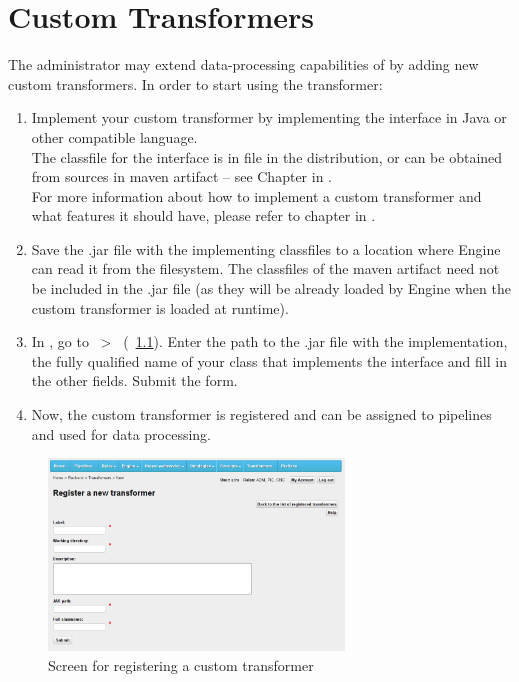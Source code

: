 \chapter{Custom Transformers}
\label{chap:customTransformers}
The administrator may extend data-processing capabilities of \odcs by adding new custom transformers. In order to start using the transformer:
\begin{enumerate}
  \item Implement your custom transformer by implementing the  interface in Java or other compatible language.\\
  The classfile for the  interface is in  file in the \odcs distribution, or can be obtained from sources in  maven artifact -- see Chapter  in . \\
  For more information about how to implement a custom transformer and what features it should have, please refer to chapter  in .
  \item Save the .jar file with the implementing classfiles to a location where Engine can read it from the filesystem. The classfiles of the  maven artifact need not be included in the .jar file (as they will be already loaded by Engine when the custom transformer is loaded at runtime).
  \item In \FE, go to ~\textgreater~ (\figurename~\ref{fig:customTransformer}). Enter the path to the .jar file with the implementation, the fully qualified name of your class that implements the  interface and fill in the other fields. Submit the form.
  \item Now, the custom transformer is registered and can be assigned to pipelines and used for data processing.
\end{enumerate}

\begin{figure}[hb]
    \centering
    \includegraphics[width=0.7\textwidth]{images/fe-custom-transformer.png}
    \caption{Screen for registering a custom transformer}
    \label{fig:customTransformer}
\end{figure}


